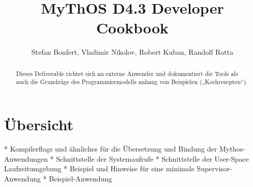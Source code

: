 

\title{MyThOS D4.3 Developer Cookbook}
\author{Stefan Bonfert, Vladimir Nikolov, Robert Kuban, Randolf Rotta}



\maketitle

\begin{abstract}
Dieses Deliverable richtet sich an externe Anwender und dokumentiert die Tools als auch die Grundzüge des Programmiermodells anhang von Beispielen („Kochrezepten“).
\end{abstract}

\newpage
\tableofcontents

\section{Übersicht}

* Kompilerflags und ähnliches für die Übersetzung und Bindung der Mythos-Anwendungen
* Schnittstelle der Systemaufrufe
* Schnittstelle der User-Space Laufzeitumgebung
* Beispiel und Hinweise für eine minimale Supervisor-Anwendung
* Beispiel-Anwendung

% 
% 


